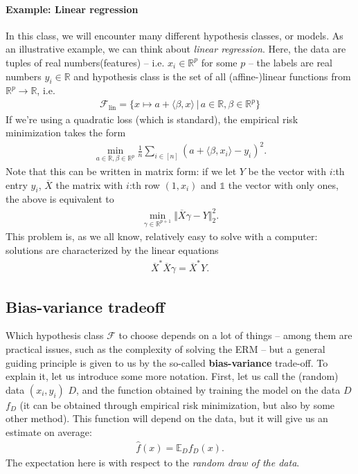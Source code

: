 \documentclass{article}
\newcommand{\calF}{\mathcal{F}}
\newcommand{\sprod}[1]{\langle #1 \rangle}
\newcommand{\R}{\mathbb{R}}
\newcommand{\norm}[1]{\Vert #1 \Vert}
\newcommand{\one}{\mathds{1}}
\begin{document}
\paragraph{Example: Linear regression} In this class, we will encounter many different hypothesis classes, or models. As an illustrative example, we can think about \emph{linear regression}. Here, the data are tuples of real numbers(features) -- i.e. $x_i \in \R^p$ for some $p$ -- the labels are real numbers $y_i \in \R$ and hypothesis class is the set of all (affine-)linear functions from $\R^p \to \R$, i.e.
\begin{align*}
    \calF_{\mathrm{lin}} = \{x \mapsto a + \sprod{\beta, x} \, \vert \, a \in \R, \beta \in \R^p\}
\end{align*}
If we're using a quadratic loss (which is standard), the empirical risk minimization takes the form
\begin{align*}
    \min_{a\in \R, \beta \in \R^p} \tfrac{1}{n} \sum_{i \in [n]} (a + \sprod{\beta,x_i} - y_i)^2.
\end{align*}
Note that this can be written in matrix form: if we let $Y$ be the vector with $i$:th entry $y_i$, $\overline{X}$ the matrix with $i$:th row $(1,x_i)$ and $\one$ the vector with only ones, the above is equivalent to 
\begin{align*}
    \min_{\gamma \in \R^{p+1}} \norm{\overline{X}\gamma -Y}_2^2.
\end{align*}
This problem is, as we all know, relatively easy to solve with a computer: solutions are characterized by the linear equations
\begin{align*}
    \overline{X}^*\overline{X}\gamma = \overline{X}^*Y.
\end{align*}

\subsection{Bias-variance tradeoff}
Which hypothesis class $\calF$ to choose depends on a lot of things -- among them are practical issues, such as the complexity of solving the ERM -- but a general guiding principle is given to us by the so-called \textbf{bias-variance} trade-off. To explain it, let us introduce some more notation. First, let us call the (random) data $(x_i,y_i)$ $D$, and the function obtained by training the model on the data $D$ $f_D$ (it can be obtained through empirical risk minimization, but also by some other method). This function will depend on the data, but it will give us an estimate on average:
\begin{align*}
    \widehat{f}(x) = \mathbb{E}_D f_D(x).
\end{align*}
The expectation here is with respect to the \emph{random draw of the data}.
\end{document}
